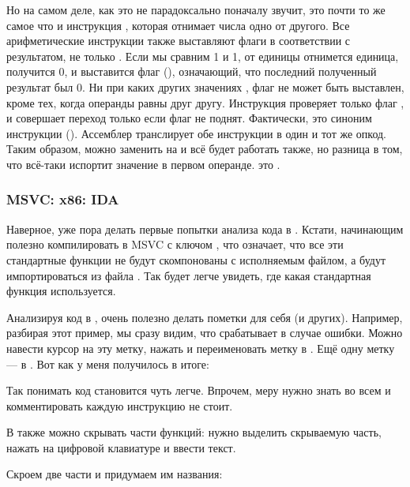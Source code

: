 \label{CMPandSUB}
Но на самом деле, как это не парадоксально поначалу звучит, \CMP это почти то же самое что и инструкция \SUB, которая отнимает числа одно от другого.
Все арифметические инструкции также выставляют флаги в соответствии с результатом, не только \CMP.
Если мы сравним 1 и 1, от единицы отнимется единица, получится 0, и выставится флаг \ZF (), означающий, что последний полученный результат был 0.
Ни при каких других значениях \EAX, флаг \ZF не может быть выставлен, кроме тех, когда операнды равны друг другу.
Инструкция \JNE проверяет только флаг \ZF, и совершает переход только если флаг не поднят. Фактически, \JNE это синоним инструкции \JNZ ().
Ассемблер транслирует обе инструкции в один и тот же опкод.
Таким образом, можно \CMP заменить на \SUB и всё будет работать также, но разница в том, что \SUB всё-таки испортит значение в первом операнде.
\CMP это .

\subsubsection{MSVC: x86: IDA}

Наверное, уже пора делать первые попытки анализа кода в \IDA.
Кстати, начинающим полезно компилировать в MSVC с ключом , что означает, что все эти стандартные
функции не будут скомпонованы с исполняемым файлом, а будут импортироваться из файла .
Так будет легче увидеть, где какая стандартная функция используется.

Анализируя код в \IDA, очень полезно делать пометки для себя (и других).
Например, разбирая этот пример, мы сразу видим, что  срабатывает в случае ошибки.
Можно навести курсор на эту метку, нажать  и переименовать метку в .
Ещё одну метку --- в .
Вот как у меня получилось в итоге:



Так понимать код становится чуть легче.
Впрочем, меру нужно знать во всем и комментировать каждую инструкцию не стоит.

В \IDA также можно скрывать части функций: нужно выделить скрываемую часть, нажать \q{--} на цифровой клавиатуре и ввести текст.

Скроем две части и придумаем им названия:

